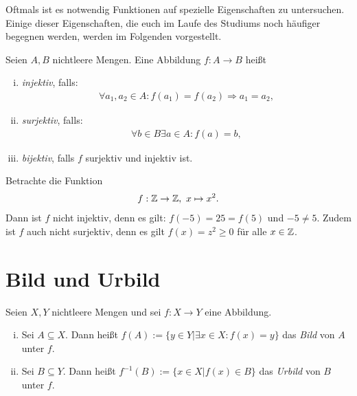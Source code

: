 Oftmals ist es notwendig Funktionen auf spezielle Eigenschaften zu untersuchen. Einige dieser Eigenschaften,
die euch im Laufe des Studiums noch häufiger begegnen werden, werden im Folgenden vorgestellt. %

\begin{mydef}
    Seien $A,B$ nichtleere Mengen. Eine Abbildung $f:A \to B$ heißt
    \begin{enumerate}[(i)]
        \item
        \textit{injektiv}, falls: 
        \begin{align*}
            \forall a_1,a_2 \in A: f(a_1) = f(a_2) \Rightarrow a_1 = a_2, 
        \end{align*}
        \item 
        \textit{surjektiv}, falls: 
        \begin{align*}
            \forall b \in B \exists a \in A: f(a) = b,
        \end{align*}
        \item 
        \textit{bijektiv}, falls $f$ surjektiv und injektiv ist. 
    \end{enumerate}
\end{mydef}

\begin{example}
    Betrachte die Funktion 
    \begin{align*}
        f: \mathbb{Z} \to \mathbb{Z}, \ x \mapsto x^2.
    \end{align*}
    Dann ist $f$ nicht injektiv, denn es gilt: $f(-5) = 25 = f(5)$ und $-5 \neq 5$. Zudem ist $f$ auch nicht surjektiv, denn es gilt $f(x) = z^2 \geq 0$ für alle $x \in \mathbb{Z}$. 
\end{example}

\section{Bild und Urbild} 

\begin{mydef}
    Seien $X,Y$ nichtleere Mengen und sei $f:X \to Y$ eine Abbildung. 
    \begin{enumerate}[(i)]
        \item 
        Sei $A \subseteq X$. Dann heißt $f(A):=\{y \in Y | \exists x \in X : f(x) = y \}$ das \textit{Bild} von $A$ unter $f$. 
        \item 
        Sei $B \subseteq Y$. Dann heißt $f^{-1}(B):=\{x \in X | f(x) \in B \}$ das \textit{Urbild} von $B$ unter $f$. 
    \end{enumerate}
\end{mydef}

